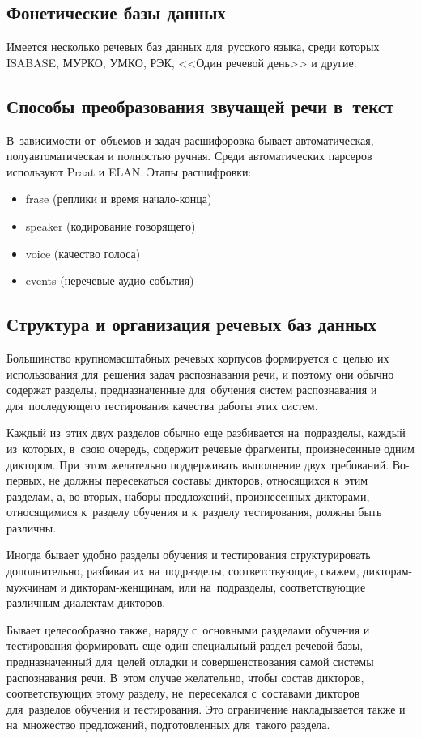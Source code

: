 \documentclass[12pt]{article}
\theoremstyle{definition}
\theoremstyle{remark}
\numberwithin{equation}{section}
\begin{document}
\subsection{Фонетические базы данных}
Имеется несколько речевых баз данных для~русского языка, среди которых
ISABASE, МУРКО, УМКО, РЭК, <<Один речевой день>> и другие.

\subsection{Способы преобразования звучащей речи в~текст}
В~зависимости от~объемов и задач расшифоровка бывает автоматическая,
полуавтоматическая и полностью ручная. Среди автоматических парсеров
используют Praat и ELAN. Этапы расшифровки:
\begin{itemize}
    \item frase (реплики и время начало-конца)
    \item speaker (кодирование говорящего)
    \item voice (качество голоса)
    \item events (неречевые аудио-события)
\end{itemize}

\subsection{Структура и организация речевых баз данных}
Большинство крупномасштабных речевых корпусов формируется с~целью их 
использования для~решения задач распознавания речи, и поэтому они обычно 
содержат разделы, предназначенные для~обучения систем распознавания и 
для~последующего тестирования качества работы этих систем.

Каждый из~этих двух разделов обычно еще разбивается на~подразделы, каждый 
из~которых, в~свою очередь, содержит речевые фрагменты, произнесенные 
одним диктором. При~этом желательно поддерживать выполнение двух требований. 
Во-первых, не должны пересекаться составы дикторов, относящихся к~этим 
разделам, а, во-вторых, наборы предложений, произнесенных дикторами, 
относящимися к~разделу обучения и к~разделу тестирования, должны быть 
различны.

Иногда бывает удобно разделы обучения и тестирования структурировать 
дополнительно, разбивая их на~подразделы, соответствующие, скажем, 
дикторам-мужчинам и дикторам-женщинам, или на~подразделы, соответствующие 
различным диалектам дикторов.

Бывает целесообразно также, наряду с~основными разделами обучения и 
тестирования формировать еще один специальный раздел речевой базы, 
предназначенный для~целей отладки и совершенствования самой системы 
распознавания речи. В~этом случае желательно, чтобы состав дикторов, 
соответствующих этому разделу, не~пересекался с~составами дикторов 
для~разделов обучения и тестирования. Это ограничение накладывается 
также и на~множество предложений, подготовленных для~такого раздела.
\end{document}
